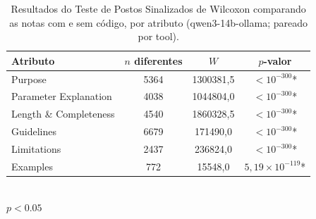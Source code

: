 \begin{table}[H]
\centering
\caption{Resultados do Teste de Postos Sinalizados de Wilcoxon comparando as notas com e sem código, por atributo (qwen3-14b-ollama; pareado por tool).}
\label{tab:wilcoxon_qwen3_14b_ollama}
\begin{tabular}{lccc}
\toprule
Atributo & $n$ diferentes & $W$ & $p$-valor \\
\midrule
Purpose & 5364 & 1300381,5 & $< 10^{-300}$* \\
Parameter Explanation & 4038 & 1044804,0 & $< 10^{-300}$* \\
Length \& Completeness & 4540 & 1860328,5 & $< 10^{-300}$* \\
Guidelines & 6679 & 171490,0 & $< 10^{-300}$* \\
Limitations & 2437 & 236824,0 & $< 10^{-300}$* \\
Examples & 772 & 15548,0 & $5,19 \times 10^{-119}$* \\
\bottomrule
\end{tabular}
\\[4pt]
{\footnotesize * $p<0.05$}
\end{table}
